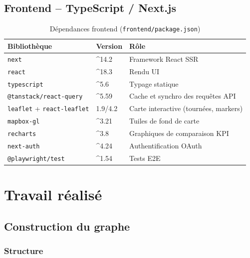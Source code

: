 \documentclass[a4paper, 12pt, twoside]{article}
\begin{document}
\subsection{Frontend -- TypeScript / Next.js}

\begin{table}[h]
  \begin{center}
    \begin{tabular}{|l|l|l|}
      \hline
      \textbf{Biblioth\`{e}que} & \textbf{Version} & \textbf{R\^{o}le} \\
      \hline
      \texttt{next} & \textasciicircum14.2 & Framework React SSR \\
      \texttt{react} & \textasciicircum18.3 & Rendu UI \\
      \texttt{typescript} & \textasciicircum5.6 & Typage statique \\
      \texttt{@tanstack/react-query} & \textasciicircum5.59 & Cache et synchro des requ\^{e}tes API \\
      \texttt{leaflet} + \texttt{react-leaflet} & 1.9/4.2 & Carte interactive (tourn\'{e}es, markers) \\
      \texttt{mapbox-gl} & \textasciicircum3.21 & Tuiles de fond de carte \\
      \texttt{recharts} & \textasciicircum3.8 & Graphiques de comparaison KPI \\
      \texttt{next-auth} & \textasciicircum4.24 & Authentification OAuth \\
      \texttt{@playwright/test} & \textasciicircum1.54 & Tests E2E \\
      \hline
    \end{tabular}
  \end{center}
  \caption{D\'{e}pendances frontend (\texttt{frontend/package.json})}
  \label{tab:frontend-libs}
\end{table}

\section{Travail r\'{e}alis\'{e}}

\subsection{Construction du graphe}

\subsubsection{Structure}
\end{document}
